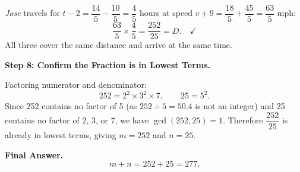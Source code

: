 \documentclass{llmxive}
\begin{document}
\begin{tcolorbox}[title=The early training stage model (scaled):, breakable]
\textit{Jose} travels for $t - 2 = \dfrac{14}{5} - \dfrac{10}{5} = \dfrac{4}{5}$
hours at speed $v+9 = \dfrac{18}{5}+\dfrac{45}{5} = \dfrac{63}{5}$ mph:
\[
\frac{63}{5} \times \frac{4}{5} = \frac{252}{25} = D. \quad \checkmark
\]
All three cover the same distance and arrive at the same time.

\medskip
\textbf{Step 8: Confirm the Fraction is in Lowest Terms.}

Factoring numerator and denominator:
\[
252 = 2^2 \times 3^2 \times 7, \qquad 25 = 5^2.
\]
Since 252 contains no factor of 5 (as $252 \div 5 = 50.4$ is not an integer)
and 25 contains no factor of 2, 3, or 7, we have $\gcd(252, 25) = 1$.
Therefore $\dfrac{252}{25}$ is already in lowest terms, giving $m = 252$ and
$n = 25$.

\medskip
\textbf{Final Answer.}
\[
m + n = 252 + 25 = \boxed{277}.
\]

\end{tcolorbox}
\end{document}
